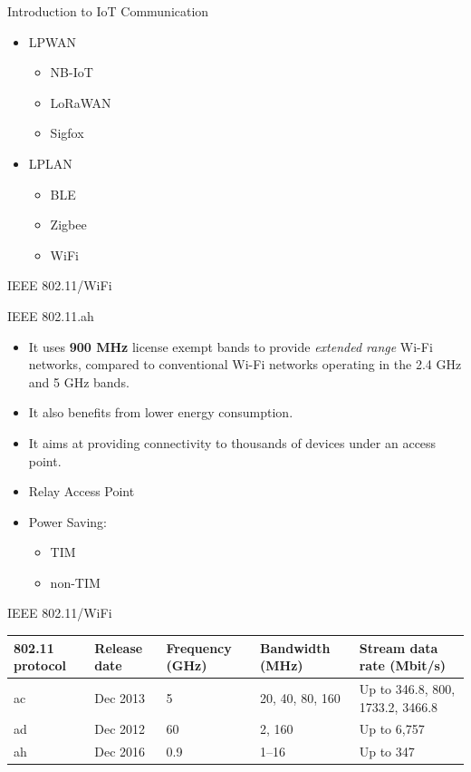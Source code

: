 \documentclass[serif,Blue]{beamer}
\begin{document}
\begin{frame}{Introduction to IoT Communication}
	\begin{itemize}
		\item LPWAN
			\begin{itemize}
				\item NB-IoT
				\item LoRaWAN
				\item Sigfox
			\end{itemize}
		\item LPLAN
			\begin{itemize}
				\item BLE
				\item Zigbee
				\item WiFi
			\end{itemize}
	\end{itemize}
\end{frame}

\begin{frame}{IEEE 802.11/WiFi}
	\begin{block}{IEEE 802.11.ah}
		\begin{itemize}\justifying{}
			\item It uses \textbf{900 MHz} license exempt bands to provide \emph{extended range} Wi-Fi networks, compared to conventional Wi-Fi networks operating in the 2.4 GHz and 5 GHz bands.
			\item It also benefits from lower energy consumption.
			\item It aims at providing connectivity to thousands of devices under an access point.
			\item Relay Access Point
			\item Power Saving:
			\begin{itemize}\justifying{}
				\item TIM
				\item non-TIM
			\end{itemize}
		\end{itemize}
	\end{block}
\end{frame}

\begin{frame}{IEEE 802.11/WiFi}
	\begin{tabular}{p{1cm} p{1cm} p{1.5cm} p{1.5cm} p{3.5cm}}
		\toprule
		802.11 protocol & Release date & Frequency (GHz) & Bandwidth (MHz) & Stream data rate (Mbit/s) \\
		\midrule
		ac & Dec 2013 & 5 & 20, 40, 80, 160 & Up to 346.8, 800, 1733.2, 3466.8\\
		ad & Dec 2012 & 60 & 2, 160 & Up to 6,757\\
		ah & Dec 2016 & 0.9 & 1--16 & Up to 347\\
		\bottomrule
	\end{tabular}
\end{frame}
\end{document}
